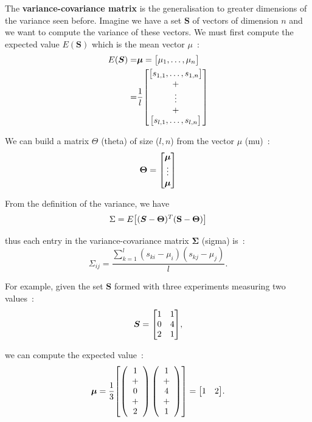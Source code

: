 \documentclass[11pt,twocolumn]{amsart} %
\newcommand{\ve}[1]{\boldsymbol{#1}}
\newcommand{\ma}[1]{\boldsymbol{#1}}
\newenvironment{m}{\begin{bmatrix}}{\end{bmatrix}}
\begin{document}
The \textbf{variance-covariance matrix} is the generalisation to greater dimensions of the variance seen before. Imagine we have a set $\ma{S}$ of vectors of dimension $n$ and we want to compute the variance of these vectors. We must first compute the expected value $E(\ma{S})$ which is the mean vector $\mu$~:
\begin{align*}
  E(\ma{S}) = & \ve{\mu} = \begin{m} \mu_1, \hdots, \mu_n \end{m} \\
       = & \frac{1}{l} \begin{m} \begin{m} s_{1,1}, \hdots, s_{1,n} \end{m} \\ + \\ \vdots \\ + \\ \begin{m} s_{l,1}, \hdots, s_{l,n} \end{m} \end{m}
\end{align*}

We can build a matrix $\Theta$ (theta) of size ($l,n$) from the vector $\mu$ (mu)~:
\[
  \ma\Theta = \begin{m} \ve{\mu} \\ \vdots \\ \ve{\mu} \end{m}
\]

From the definition of the variance, we have
\[
  \Sigma = E \begin{m} (\ma{S} - \ma\Theta)^T (\textbf{S} - \ma\Theta)\end{m}
\]

thus each entry in the variance-covariance matrix $\ma\Sigma$ (sigma) is~:
\[
  \Sigma_{ij} = \frac{\sum_{k=1}^{l} (s_{ki} - \mu_i)(s_{kj} - \mu_j)}{l}.
\]


For example, given the set $\ma{S}$ formed with three experiments measuring two values~:
\begin{displaymath}
  \ma{S} = \begin{m} 1 & 1 \\ 0 & 4 \\ 2 & 1 \end{m},
\end{displaymath}

we can compute the expected value~:
\[
  \ve{\mu} = \frac{1}{3} \begin{m} \left( \begin{array}{c} 1 \\ + \\ 0 \\ + \\ 2 \end{array} \right) \left( \begin{array}{c} 1 \\ + \\ 4 \\ + \\ 1 \end{array} \right) \end{m} = \begin{m} 1 & 2 \end{m}.
\]
\end{document}
